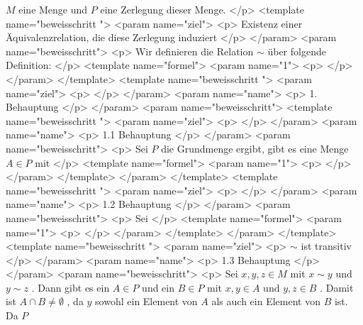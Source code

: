      $M$
     eine Menge und
     $P$
     eine Zerlegung dieser Menge.
    </p>
    <template name="beweisschritt
 ">
     <param name="ziel">
      <p>
       Existenz einer Äquivalenzrelation, die diese Zerlegung induziert
      </p>
     </param>
     <param name="beweisschritt">
      <p>
       Wir definieren die Relation
       $\sim$
       über folgende Definition:
      </p>
      <template name="formel">
       <param name="1">
        <p>
        </p>
       </param>
      </template>
      <template name="beweisschritt
 ">
       <param name="ziel">
        <p>
        </p>
       </param>
       <param name="name">
        <p>
         1. Behauptung
        </p>
       </param>
       <param name="beweisschritt">
        <template name="beweisschritt
 ">
         <param name="ziel">
          <p>
          </p>
         </param>
         <param name="name">
          <p>
           1.1 Behauptung
          </p>
         </param>
         <param name="beweisschritt">
          <p>
           Sei
           $P$
           die Grundmenge ergibt, gibt es eine Menge
           $A\in P$
           mit
          </p>
          <template name="formel">
           <param name="1">
            <p>
            </p>
           </param>
          </template>
         </param>
        </template>
        <template name="beweisschritt
 ">
         <param name="ziel">
          <p>
          </p>
         </param>
         <param name="name">
          <p>
           1.2 Behauptung
          </p>
         </param>
         <param name="beweisschritt">
          <p>
           Sei
          </p>
          <template name="formel">
           <param name="1">
            <p>
            </p>
           </param>
          </template>
         </param>
        </template>
        <template name="beweisschritt
 ">
         <param name="ziel">
          <p>
           $\sim$
           ist transitiv
          </p>
         </param>
         <param name="name">
          <p>
           1.3 Behauptung
          </p>
         </param>
         <param name="beweisschritt">
          <p>
           Sei
           $x,y,z\in M$
           mit
           $x\sim y$
           und
           $y\sim z$
           . Dann gibt es ein
           $A\in P$
           und ein
           $B\in P$
           mit
           $x,y\in A$
           und
           $y,z\in B$
           . Damit ist
           $A\cap B\ne \emptyset$
           , da
           $y$
           sowohl ein Element von
           $A$
           als auch ein Element von
           $B$
           ist. Da
           $P$
